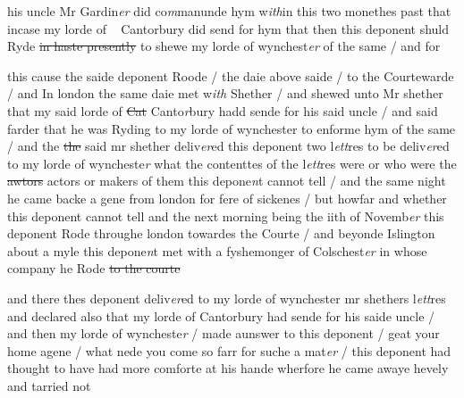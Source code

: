 \documentclass[12pt, a4paper]{book}
\begin{document}
his uncle Mr Gardin\textit{er} did co\textit{m}manunde hym w\textit{ith}in 
this two monethes past that incase my lorde of   
 Cantorbury did send for hym that then this 
deponent shuld Ryde \sout{in haste presently }to shewe
my lorde of wynchest\textit{er} of the same / and for
			 
this cause the saide deponent Roode / the daie
above saide / to the Courtewarde / and In
london the same daie met w\textit{ith} Shether / and
shewed unto Mr shether that my said 
			lorde of \sout{Cat}
Canto\textit{r}bury hadd sende for his said uncle / and 
said farder that he was Ryding to my lorde of
wynchester to enforme hym of the same / and
the \sout{the }said mr shether deliv\textit{er}ed this deponent
two l\textit{ett}res to be deliv\textit{er}ed to my lorde of wyncheste\textit{r} 
what the contenttes of the l\textit{ett}res were or who were the \sout{awtors 
                     }
                     actors 
			or makers of them this depone\textit{n}t 
cannot tell / and the same night he came backe
a gene from london for fere of sickenes / but
howfar and whether this deponent cannot tell
and the next morning being the iith of Novemb\textit{er} 
this deponent Rode throughe london towardes
the Courte / and beyonde Islington about a myle
this depone\textit{n}t met with a fyshemonger of Colschest\textit{er} 
in whose company he Rode \sout{to the courte}
                     
                     	
				\marginpar[\vspace{0.5cm}{\textcolor{Gray}{within vi myles of the Courte and there loddgid at a Joyners house Inwhat tune he cannot tell / and the next daie in the morning he Rode to the Courte}}]{}
			
            	
				\marginpar[\vspace{0.5cm}{\textcolor{Gray}{n}}]{}
			

		\ifthenelse{\isodd{\thepage}}
		{\reversemarginpar}
		{\normalmarginpar}
		and there thes deponent deliv\textit{er}ed to my lorde of 
wynchester mr shethers l\textit{ett}res and declared also 
that my lorde of Cantorbury had sende for his saide uncle / and then my lorde of wyncheste\textit{r} / made
aunswer to this deponent / geat your home agene / what 
nede you come so farr for suche a mat\textit{er} / this deponent
 had thought to have had more comforte at his hande
wherfore he came awaye hevely and tarried not 
\end{document}
